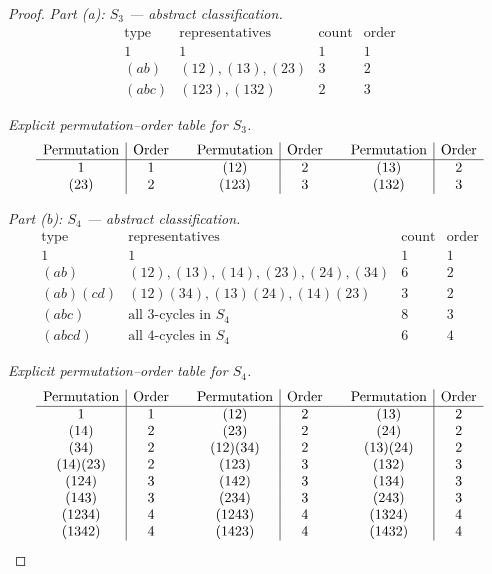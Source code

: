 \documentclass[12pt]{article}
\theoremstyle{definition}
\begin{document}
\dotfill

\begin{proof}
\noindent\emph{Part (a): $S_3$ — abstract classification.}\\
\[
\begin{array}{llll}
\text{type} & \text{representatives} & \text{count} & \text{order}\\\hline
1 & 1 & 1 & 1\\
(ab) & (12),(13),(23) & 3 & 2\\
(abc) & (123),(132) & 2 & 3
\end{array}
\]

\medskip
\noindent\emph{Explicit permutation–order table for $S_3$.}\\[-0.4em]
\begingroup\small
\[
\begin{array}{c|c@{\qquad}c|c@{\qquad}c|c}
\text{Permutation} & \text{Order} & \text{Permutation} & \text{Order} & \text{Permutation} & \text{Order}\\\hline
1 & 1 & (12) & 2 & (13) & 2\\
(23) & 2 & (123) & 3 & (132) & 3
\end{array}
\]
\endgroup

\dotfill

\noindent\emph{Part (b): $S_4$ — abstract classification.}\\
\[
\begin{array}{llll}
\text{type} & \text{representatives} & \text{count} & \text{order}\\\hline
1 & 1 & 1 & 1\\
(ab) & (12),(13),(14),(23),(24),(34) & 6 & 2\\
(ab)(cd) & (12)(34),(13)(24),(14)(23) & 3 & 2\\
(abc) & \text{all 3-cycles in }S_4 & 8 & 3\\
(abcd) & \text{all 4-cycles in }S_4 & 6 & 4
\end{array}
\]

\medskip
\noindent\emph{Explicit permutation–order table for $S_4$.}\\[-0.4em]
\begingroup\small
\[
\begin{array}{c|c@{\qquad}c|c@{\qquad}c|c}
\text{Permutation} & \text{Order} & \text{Permutation} & \text{Order} & \text{Permutation} & \text{Order}\\\hline
1 & 1 & (12) & 2 & (13) & 2\\
(14) & 2 & (23) & 2 & (24) & 2\\
(34) & 2 & (12)(34) & 2 & (13)(24) & 2\\
(14)(23) & 2 & (123) & 3 & (132) & 3\\
(124) & 3 & (142) & 3 & (134) & 3\\
(143) & 3 & (234) & 3 & (243) & 3\\
(1234) & 4 & (1243) & 4 & (1324) & 4\\
(1342) & 4 & (1423) & 4 & (1432) & 4
\end{array}
\]
\endgroup

\end{proof}
\end{document}
